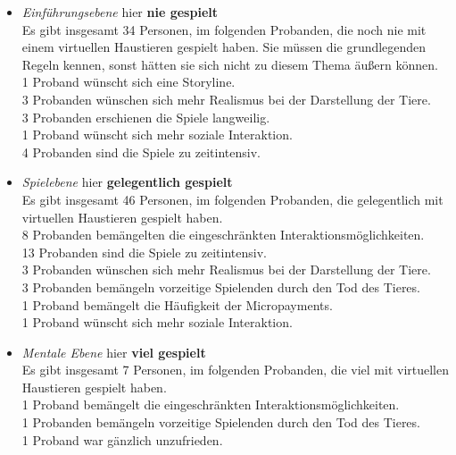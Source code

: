 \begin{description}
\begin{itemize}
\item \textit{Einführungsebene} hier \textbf{nie gespielt} \\
Es gibt insgesamt 34 Personen, im folgenden Probanden, die noch nie mit einem virtuellen Haustieren gespielt haben. Sie müssen die grundlegenden Regeln kennen, sonst hätten sie sich nicht zu diesem Thema äußern können. \\
1 Proband wünscht sich eine Storyline. \\
3 Probanden wünschen sich mehr Realismus bei der Darstellung der Tiere. \\
3 Probanden erschienen die Spiele langweilig. \\ 
1 Proband wünscht sich mehr soziale Interaktion. \\
4 Probanden sind die Spiele zu zeitintensiv. \\



\item \textit{Spielebene} hier \textbf{gelegentlich gespielt}\\
Es gibt insgesamt 46 Personen, im folgenden Probanden, die gelegentlich mit virtuellen Haustieren gespielt haben. \\
8 Probanden bemängelten die eingeschränkten Interaktionsmöglichkeiten. \\
13 Probanden sind die Spiele zu zeitintensiv.\\
3 Probanden wünschen sich mehr Realismus bei der Darstellung der Tiere. \\
3 Probanden bemängeln vorzeitige Spielenden durch den Tod des Tieres.\\
1 Proband bemängelt die Häufigkeit der Micropayments. \\
1 Proband wünscht sich mehr soziale Interaktion. \\


\item \textit{Mentale Ebene} hier \textbf{viel gespielt}\\
Es gibt insgesamt 7 Personen, im folgenden Probanden, die viel mit virtuellen Haustieren gespielt haben. \\
1 Proband bemängelt die eingeschränkten Interaktionsmöglichkeiten. \\
1 Probanden bemängeln vorzeitige Spielenden durch den Tod des Tieres. \\
1 Proband war gänzlich unzufrieden.
\end{itemize}



\end{description}
